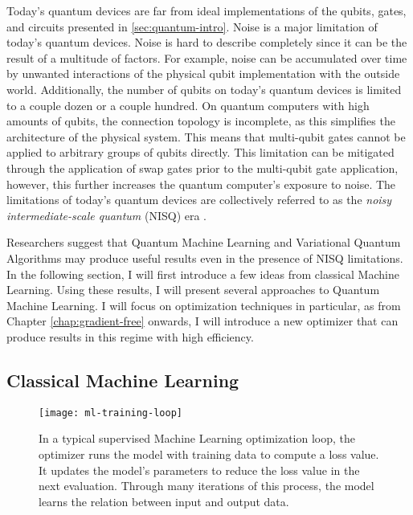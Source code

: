 Today's quantum devices are far from ideal implementations of the qubits, gates,
and circuits presented in \autoref{sec:quantum-intro}.
Noise is a major limitation of today's quantum devices.
Noise is hard to describe completely since it can be the result of a multitude
of factors.
For example, noise can be accumulated over time by unwanted interactions of the
physical qubit implementation with the outside world.
Additionally, the number of qubits on today's quantum devices is limited to a
couple dozen or a couple hundred.
On quantum computers with high amounts of qubits, the connection topology is
incomplete, as this simplifies the architecture of the physical system. 
This means that multi-qubit gates cannot be applied to arbitrary groups of
qubits directly.
This limitation can be mitigated through the application of swap gates prior
to the multi-qubit gate application, however, this further increases the quantum
computer's exposure to noise.
The limitations of today's quantum devices are collectively referred to as the
\emph{noisy intermediate-scale quantum} (NISQ) era
\cite{preskill_quantum_2018,nielsen_quantum_2007}.

Researchers suggest that Quantum Machine Learning and Variational Quantum
Algorithms may produce useful results even in the presence of NISQ limitations.
In the following section, I will first introduce a few ideas from classical
Machine Learning.
Using these results, I will present several approaches to Quantum Machine
Learning.
I will focus on optimization techniques in particular, as from Chapter
\ref{chap:gradient-free} onwards, I will introduce a new optimizer that can
produce results in this regime with high efficiency.

\subsection{Classical Machine Learning}
\label{sec:classical-ml-intro}

\begin{figure}
    \centering
    \texttt{[image: ml-training-loop]}
    \caption{In a typical supervised Machine Learning optimization loop, the
        optimizer runs the model with training data to compute a loss value.
        It updates the model's parameters to reduce the loss value in the next
        evaluation.
        Through many iterations of this process, the model learns the relation
        between input and output data.}
    \label{fig:ml-training-loop}
\end{figure}

